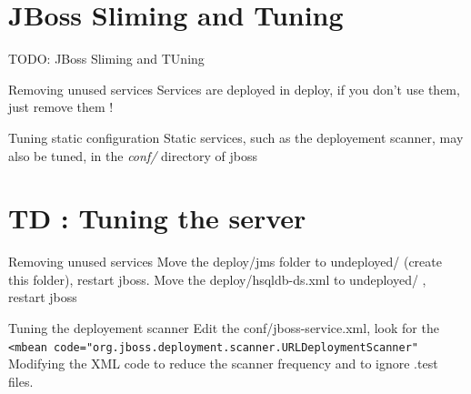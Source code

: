 \documentclass[handout]{beamer}
\begin{document}
\section{JBoss Sliming and Tuning}
	\begin{frame}
		TODO: JBoss Sliming and TUning
		\begin{block}{Removing unused services}
			Services are deployed in deploy, if you don't use them, just remove them !
		\end{block}
		\begin{block}{Tuning static configuration}
			Static services, such as the deployement scanner, may also be tuned, in the \textit{conf/} directory of jboss
		\end{block}
	\end{frame}
\section{TD : Tuning the server}
	\begin{frame}
		\begin{block}{Removing unused services}
			Move the deploy/jms folder to undeployed/ (create this folder), restart jboss.
			Move the deploy/hsqldb-ds.xml to undeployed/ , restart jboss
		\end{block}		
		\begin{block}{Tuning the deployement scanner}
			Edit the conf/jboss-service.xml, look for the \texttt{<mbean code="org.jboss.deployment.scanner.URLDeploymentScanner"}
			Modifying the XML code to reduce the scanner frequency and to ignore .test files.
		\end{block}		
	\end{frame}
\end{document}
